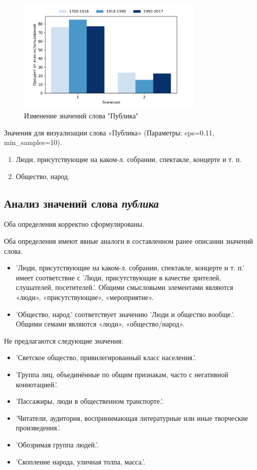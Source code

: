 \begin{figure}[H]
	\centering
	\includegraphics[width=0.8\textwidth]{img/visualizations/publika_minimal}
	\caption{Изменение значений слова "Публика"}
	\label{fig:Публика}
\end{figure}

Значения для визуализации слова «Публика» (Параметры: eps=0.11, min\_samples=10).

\begin{enumerate}
    \item Люди, присутствующие на каком-л. собрании, спектакле, концерте и т. п.
    \item Общество, народ.
\end{enumerate}

\subsection*{Анализ значений слова \textit{публика}}

Оба определения корректно сформулированы.

Оба определения имеют явные аналоги в составленном ранее описании значений слова.

\begin{itemize}
    \item ’Люди, присутствующие на каком-л. собрании, спектакле, концерте и т. п.’ имеет соответствие с
    ’Люди, присутствующие в качестве зрителей, слушателей, посетителей.’.
    Общими смысловыми элементами являются «люди», «присутствующие», «мероприятие».

    \item ’Общество, народ.’ соответствует значению ’Люди и общество вообще.’.
    Общими семами являются «люди», «общество/народ».
\end{itemize}

Не предлагаются следующие значения:
\begin{itemize}
    \item ’Светское общество, привилегированный класс населения.’.
    \item ’Группа лиц, объединённые по общим признакам, часто с негативной коннотацией.’.
    \item ’Пассажиры, люди в общественном транспорте.’.
    \item ’Читатели, аудитория, воспринимающая литературные или иные творческие произведения.’.
    \item ’Обозримая группа людей.’.
    \item ’Скопление народа, уличная толпа, масса.’.
\end{itemize}

